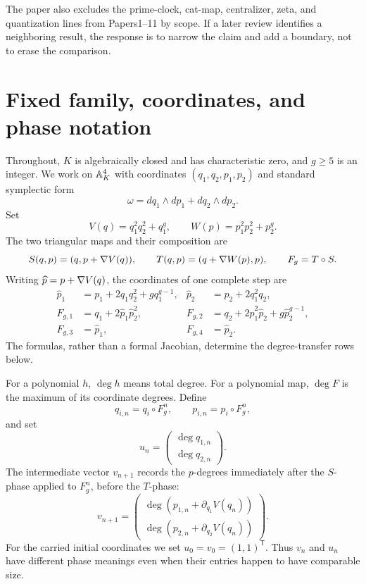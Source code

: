 \documentclass[11pt]{article}
\theoremstyle{remark}
\numberwithin{equation}{section}
\begin{document}
The paper also excludes the prime-clock, cat-map, centralizer, zeta, and
quantization lines from Papers1--11 by scope. If a later review identifies a
neighboring result, the response is to narrow the claim and add a boundary,
not to erase the comparison.

\section{Fixed family, coordinates, and phase notation}\label{sec:setup}

Throughout, \(K\) is algebraically closed and has characteristic zero, and
\(g\geq5\) is an integer.  We work on
\(\mathbb{A}^4_K\) with coordinates
\((q_1,q_2,p_1,p_2)\) and standard symplectic form
\[
 \omega=dq_1\wedge dp_1+dq_2\wedge dp_2.
\]
Set
\[
 V(q)=q_1^2q_2^2+q_1^g,\qquad
 W(p)=p_1^2p_2^2+p_2^g.
\]
The two triangular maps and their composition are
\[
 S(q,p)=(q,p+\nabla V(q)),\qquad
 T(q,p)=(q+\nabla W(p),p),\qquad
 F_g=T\circ S.
\]
Writing
\(\widehat p=p+\nabla V(q)\), the coordinates of one complete step are
\begin{align}
 \widehat p_1&=p_1+2q_1q_2^2+gq_1^{g-1},&
 \widehat p_2&=p_2+2q_1^2q_2,\label{eq:phat}\\
 F_{g,1}&=q_1+2\widehat p_1\widehat p_2^2,&
 F_{g,2}&=q_2+2\widehat p_1^2\widehat p_2+
 g\widehat p_2^{g-1},\label{eq:qout}\\
 F_{g,3}&=\widehat p_1,&
 F_{g,4}&=\widehat p_2.\label{eq:pout}
\end{align}
The formulas, rather than a formal Jacobian, determine the degree-transfer
rows below.

For a polynomial \(h\), \(\deg h\) means total degree.  For a polynomial map,
\(\deg F\) is the maximum of its coordinate degrees.  Define
\[
 q_{i,n}=q_i\circ F_g^n,\qquad
 p_{i,n}=p_i\circ F_g^n,
\]
and set
\[
 u_n=\begin{pmatrix}\deg q_{1,n}\\ \deg q_{2,n}\end{pmatrix}.
\]
The intermediate vector \(v_{n+1}\) records the \(p\)-degrees immediately
after the \(S\)-phase applied to \(F_g^n\), before the \(T\)-phase:
\[
 v_{n+1}=
 \begin{pmatrix}\deg(p_{1,n}+\partial_{q_1}V(q_n))\\
 \deg(p_{2,n}+\partial_{q_2}V(q_n))\end{pmatrix}.
\]
For the carried initial coordinates we set \(u_0=v_0=(1,1)^{\mathsf T}\).
Thus \(v_n\) and \(u_n\) have different phase meanings even when their
entries happen to have comparable size.
\end{document}

